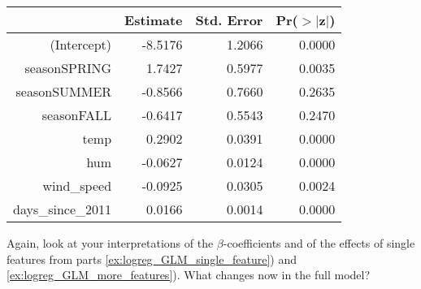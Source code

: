 {\begin{enumerate}[a)]
    \begin{table}[H]
        \centering
        \begin{tabular}{rrrr}
            \hline
            & Estimate & Std. Error & Pr($>$$|$z$|$) \\ 
            \hline
            (Intercept) & -8.5176 & 1.2066 & 0.0000 \\ 
            seasonSPRING & 1.7427 & 0.5977 & 0.0035 \\ 
            seasonSUMMER & -0.8566 & 0.7660 & 0.2635 \\ 
            seasonFALL & -0.6417 & 0.5543 & 0.2470 \\ 
            temp & 0.2902 & 0.0391 & 0.0000 \\ 
            hum & -0.0627 & 0.0124 & 0.0000 \\ 
            wind\_speed & -0.0925 & 0.0305 & 0.0024 \\ 
            days\_since\_2011 & 0.0166 & 0.0014 & 0.0000 \\ 
            \hline
        \end{tabular}
    \end{table}

    Again, look at your interpretations of the \(\beta\)-coefficients and of the effects of single features from parts \ref{ex:logreg_GLM_single_feature}) and \ref{ex:logreg_GLM_more_features}).
    What changes now in the full model?
        
\end{enumerate}

}
